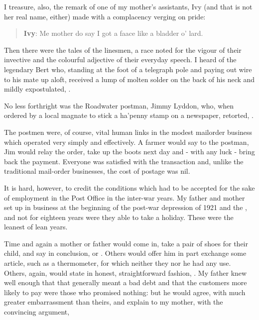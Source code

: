 I treasure, also, the remark of one of my mother's assistants, Ivy (and that is not her real name, either) made with a complacency verging on pride:

\begin{quotation}
\textbf{Ivy}: Me mother do say I got a faace like a bladder o' lard.
\end{quotation}

Then there were the tales of the linesmen, a race noted for the vigour of their invective and the colourful adjective of their everyday speech. I heard of the legendary Bert who, standing at the foot of a telegraph pole and paying out wire to his mate up aloft, received a lump of molten solder on the back of his neck and mildly expostulated, .

No less forthright was the Roadwater postman, Jimmy Lyddon, who, when ordered by a local magnate to stick a ha'penny stamp on a newspaper, retorted, .

The postmen were, of course, vital human links in the modest mailorder business which operated very simply and effectively. A farmer  would say to the postman,  Jim would relay the order, take up the boots next day and - with any luck - bring back the payment. Everyone was satisfied with the transaction and, unlike the traditional mail-order businesses, the cost of postage was nil.

It is hard, however, to credit the conditions which had to be accepted for the sake of employment in the Post Office in the inter-war years. My father and mother set up in business at the beginning of the post-war depression of 1921 and the , and not for eighteen years were they able to take a holiday. These were the leanest of lean years.

Time and again a mother or father would come in, take a pair of shoes for their child, and say in conclusion,  or . Others would offer him in part exchange some article, such as a thermometer, for which neither they nor he had any use. Others, again, would state in honest, straightforward fashion, . My father knew well enough that that  generally meant a bad debt and that the customers more likely to pay were those who promised nothing: but he would agree, with much greater embarrassment than theirs, and explain to my mother, with the convincing argument, 

